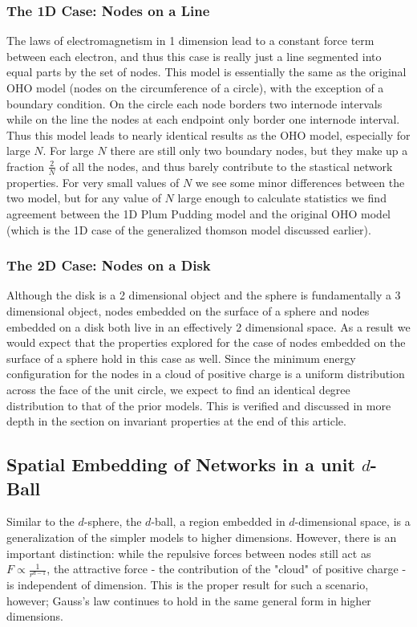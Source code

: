 \documentclass[aps,pre,reprint,superscriptaddress,amsmath,amssymb,nofootinbib]{revtex4-1}
\begin{document}
\subsubsection{The 1D Case: Nodes on a Line}
The laws of electromagnetism in 1 dimension lead to a constant force term between each electron, and thus this case is really just a line segmented into equal parts by the set of nodes. 
This model is essentially the same as the original OHO model (nodes on the circumference of a circle), with the exception of a boundary condition. 
On the circle each node borders two internode intervals while on the line the nodes at each endpoint only border one internode interval.
Thus this model leads to nearly identical results as the OHO model, especially for large $N$.
For large $N$ there are still only two boundary nodes, but they make up a fraction $\frac{2}{N}$ of all the nodes, and thus barely contribute to the stastical network properties.
For very small values of $N$ we see some minor differences between the two model, but for any value of $N$ large enough to calculate statistics we find agreement between the 1D Plum Pudding model and the original OHO model (which is the 1D case of the generalized thomson model discussed earlier).



\subsubsection{The 2D Case: Nodes on a Disk}
Although the disk is a 2 dimensional object and the sphere is fundamentally a 3 dimensional object, nodes embedded on the surface of a sphere and nodes embedded on a disk both live in an effectively 2 dimensional space.
As a result we would expect that the properties explored for the case of nodes embedded on the surface of a sphere hold in this case as well.
Since the minimum energy configuration for the nodes in a cloud of positive charge is a uniform distribution across the face of the unit circle, we expect to find an identical degree distribution to that of the prior models.
This is verified and discussed in more depth in the section on invariant properties at the end of this article.

\subsection{Spatial Embedding of Networks in a unit $d$-Ball}
Similar to the $d$-sphere, the $d$-ball, a region embedded in $d$-dimensional space, is a generalization of the simpler models to higher dimensions.  
However, there is an important distinction: while the repulsive forces between nodes still act as $F \propto \frac{1}{r^{d-1}}$, the attractive force - the contribution of the "cloud" of positive charge - is independent of dimension.  
This is the proper result for such a scenario, however; Gauss's law continues to hold in the same general form in higher dimensions.
\end{document}
